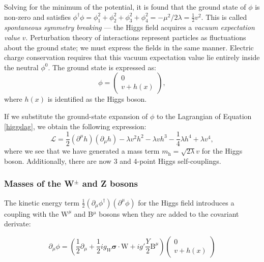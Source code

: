 Solving for the minimum of the potential, it is found that the ground state of $\phi$ is non-zero and satisfies $\phi^{\dagger}\phi = \phi_{1}^{2} + \phi_{2}^{2} + \phi_{3}^{2}  + \phi_{4}^{2} = - \mu^{2}/{2\lambda} = \frac{1}{2}v^{2}$. This is called \textit{spontaneous symmetry breaking} --- the Higgs field acquires a \textit{vacuum expectation value} $v$. Perturbation theory of interactions represent particles as fluctuations about the ground state; we must express the fields in the same manner. Electric charge conservation requires that this vacuum expectation value lie entirely inside the neutral $\phi^{0}$. The ground state is expressed as: 
\begin{equation}
\phi = \begin{pmatrix} 0 \\  v + h(x) \end{pmatrix},
\end{equation}
where $h(x)$ is identified as the Higgs boson.

If we substitute the ground-state expansion of $\phi$ to the Lagrangian of Equation \ref{higgslag}, we obtain the following expression:
\begin{equation}
\mathcal{L} = \frac{1}{2}(\partial^{\mu}h)(\partial_{\mu}h) - \lambda v^{2} h^{2} - \lambda vh^{3} - \frac{1}{4}\lambda h^{4} + \lambda v^{4},
\end{equation}
where we see that we have generated a mass term $m_{\mathrm{h}} = \sqrt{2 \lambda} v$ for the Higgs boson. Additionally, there are now 3 and 4-point Higgs self-couplings.

\subsubsection{Masses of the W$^{\pm}$ and Z bosons}

The kinetic energy term $\frac{1}{2} (\partial_{\mu}\phi^{\dagger})(\partial^{\mu}\phi)$ for the Higgs field introduces a coupling with the $\bm{\mathrm{W}}^{\mu}$ and B$^{\mu}$ bosons when they are added to the covariant derivate:

\begin{equation}
\partial_{\mu}\phi = \left( \frac{1}{2}\partial_{\mu} + \frac{1}{2} i g_{W}\bm{\sigma}\cdot\bm{\mathrm{W}} + i g' \frac{Y}{2} \mathrm{B}^{\mu} \right) \begin{pmatrix} 0 \\ v + h(x) \end{pmatrix}
\end{equation}

